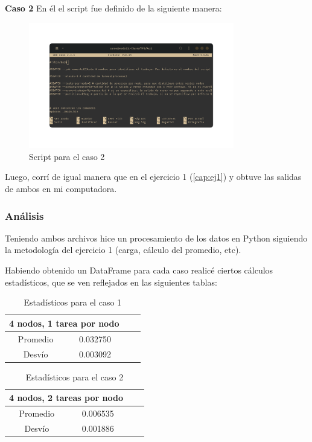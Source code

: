 \textbf{Caso 2}
En él el script fue definido de la siguiente manera:
\begin{figure}[H]
    \centering
    \includegraphics[width=0.80\textwidth]{Images/ej2/scriptcaso2.png}
    \caption{Script para el caso 2}
    \label{fig:scriptcaso2}
\end{figure}

Luego, corrí de igual manera que en el ejercicio 1 (\ref{cap:ej1}) y obtuve las salidas de ambos en mi computadora.


\subsubsection{Análisis}

Teniendo ambos archivos hice un procesamiento de los datos en Python siguiendo la metodología del ejercicio 1 (carga, cálculo del promedio, etc).

Habiendo obtenido un DataFrame para cada caso realicé ciertos cálculos estadísticos, que se ven reflejados en las siguientes tablas: 
\begin{table}[H]
\begin{center}
    \begin{tabular}{| c | c | c | c | }
    \hline
    \multicolumn{2}{|c|}{4 nodos, 1 tarea por nodo} \\ \hline
    Promedio & 0.032750 \\ 
    Desvío & 0.003092 \\ \hline
    \end{tabular}
    \caption{Estadísticos para el caso 1}
    \label{tab:caso1}
\end{center}
\end{table}

\begin{table}[H]
\begin{center}
    \begin{tabular}{| c | c | c | c | }
    \hline
    \multicolumn{2}{|c|}{4 nodos, 2 tareas por nodo} \\ \hline
    Promedio & 0.006535 \\ 
    Desvío & 0.001886 \\ \hline
    \end{tabular}
    \caption{Estadísticos para el caso 2}
    \label{tab:caso2}
\end{center}
\end{table}

